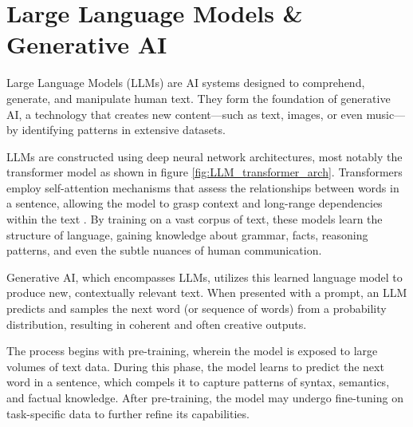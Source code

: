 




\section{Large Language Models \& Generative AI}
Large Language Models (LLMs) are AI systems designed to comprehend, generate, and manipulate human text. They form the foundation of generative AI, a technology that creates new content—such 
as text, images, or even music—by identifying patterns in extensive datasets.

LLMs are constructed using deep neural network architectures, most notably the transformer model as shown in figure \ref{fig:LLM_transformer_arch}. Transformers 
employ self-attention mechanisms that assess the relationships between words in a sentence, allowing the model to grasp context and long-range dependencies within the text  \cite{NIPS2017_3f5ee243}. 
By training on a vast corpus of text, these models learn the structure of language, gaining knowledge about grammar, facts, reasoning patterns, and even the subtle nuances of human communication.

Generative AI, which encompasses LLMs, utilizes this learned language model to produce new, contextually relevant text. When presented with a prompt, an LLM predicts and samples the next word 
(or sequence of words) from a probability distribution, resulting in coherent and often creative outputs.

The process begins with pre-training, wherein the model is exposed to large volumes of text data. During this phase, the model learns to predict the next word in a sentence, which compels it to 
capture patterns of syntax, semantics, and factual knowledge. After pre-training, the model may undergo fine-tuning on task-specific data to further refine its capabilities.

